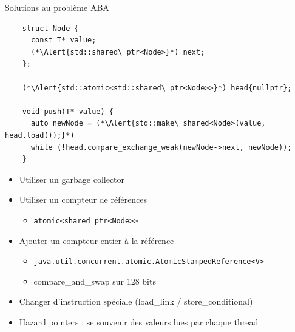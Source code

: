 
\begingroup

\begin{frame}[fragile]{Solutions au problème ABA}

  \vspace{-3mm}
  \begin{lstlisting}
    struct Node {
      const T* value;
      (*\Alert{std::shared\_ptr<Node>}*) next;
    };

    (*\Alert{std::atomic<std::shared\_ptr<Node>>}*) head{nullptr};
 
    void push(T* value) {
      auto newNode = (*\Alert{std::make\_shared<Node>(value, head.load());}*)
      while (!head.compare_exchange_weak(newNode->next, newNode));
    }
  \end{lstlisting}  
  
  \begin{itemize}

  \item Utiliser un garbage collector

  \item Utiliser un compteur de références
    \begin{itemize}
    \item {} \lstinline{atomic<shared_ptr<Node>>}
    \end{itemize}

  \item Ajouter un compteur entier à la référence
    \begin{itemize}
    \item {} \lstinline{java.util.concurrent.atomic.AtomicStampedReference<V>}
    \item compare\_and\_swap sur 128 bits 
    \end{itemize}

  \item Changer d'instruction spéciale (load\_link / store\_conditional)

  \item Hazard pointers : se souvenir des valeurs lues par chaque thread

  \end{itemize}

  
\end{frame}

\endgroup
\endinput
